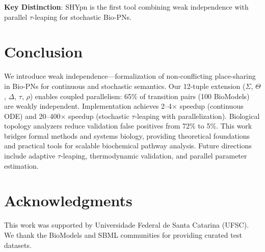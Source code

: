 \documentclass[twocolumn,11pt]{article}
\begin{document}
\textbf{Key Distinction}: SHYpn is the first tool combining weak independence with parallel $\tau$-leaping for stochastic Bio-PNs.

\section{Conclusion}

We introduce weak independence---formalization of non-conflicting place-sharing in Bio-PNs for continuous and stochastic semantics. Our 12-tuple extension ($\Sigma$, $\Theta$, $\Delta$, $\tau$, $\rho$) enables coupled parallelism: 65\% of transition pairs (100 BioModels) are weakly independent. Implementation achieves 2--4$\times$ speedup (continuous ODE) and 20--400$\times$ speedup (stochastic $\tau$-leaping with parallelization). Biological topology analyzers reduce validation false positives from 72\% to 5\%. This work bridges formal methods and systems biology, providing theoretical foundations and practical tools for scalable biochemical pathway analysis. Future directions include adaptive $\tau$-leaping, thermodynamic validation, and parallel parameter estimation.

\section*{Acknowledgments}
This work was supported by Universidade Federal de Santa Catarina (UFSC). We thank the BioModels and SBML communities for providing curated test datasets.



\end{document}
